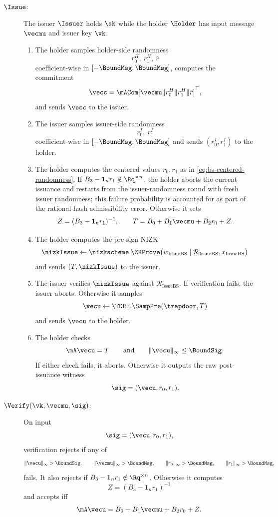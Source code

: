 \begin{description}
\item[$\Issue$:] The issuer $\Issuer$ holds $\sk$ while the holder $\Holder$ has input message $\vecmu$ and
issuer key $\vk$.
\begin{enumerate}[leftmargin=1.25em]
  \item The holder samples holder-side randomness
  \[
    r_0^H,\ r_1^H,\ \bar r
  \]
  coefficient-wise in $[-\BoundMsg,\BoundMsg]$, computes the commitment
  \[
    \vecc=\mACom[\vecmu\Vert r_0^H\Vert r_1^H\Vert \bar r]^\top,
  \]
  and sends $\vecc$ to the issuer.
  \item The issuer samples issuer-side randomness
  \[
    r_0^I,\ r_1^I
  \]
  coefficient-wise in $[-\BoundMsg,\BoundMsg]$ and sends $(r_0^I,r_1^I)$ to the holder.
  \item The holder computes the centered values $r_0,r_1$ as in
  \eqref{eq:bs-centered-randomness}.  If $B_3-\mathbf 1_n r_1\notin\Rq^{\times n}$, the holder aborts the current issuance and restarts from the issuer-randomness round with fresh issuer randomness; this failure probability is accounted for as part of the rational-hash admissibility error.  Otherwise it sets
  \[
    Z=(B_3-\mathbf 1_n r_1)^{-1},
    \qquad
    T=B_0+B_1\vecmu+B_2r_0+Z.
  \]
  \item The holder computes the pre-sign NIZK
  \[
    \nizkIssue\gets \nizkscheme.\ZKProve
      \bigl(w_{\mathrm{IssueBS}}\mid \mathcal R_{\mathrm{IssueBS}},x_{\mathrm{IssueBS}}\bigr)
  \]
  and sends $(T,\nizkIssue)$ to the issuer.
  \item The issuer verifies $\nizkIssue$ against $\mathcal R_{\mathrm{IssueBS}}$.  If verification fails, the issuer
  aborts.  Otherwise it samples
  \[
    \vecu\gets \TDRH.\SampPre(\trapdoor,T)
  \]
  and sends $\vecu$ to the holder.
  \item The holder checks
  \[
    \mA\vecu=T
    \qquad\text{and}\qquad
    \|\vecu\|_\infty\le \BoundSig.
  \]
  If either check fails, it aborts.  Otherwise it outputs the raw post-issuance witness
  \[
    \sig=(\vecu,r_0,r_1).
  \]
\end{enumerate}

\item[$\Verify(\vk,\vecmu,\sig)$:] On input
\[
  \sig=(\vecu,r_0,r_1),
\]
verification rejects if any of
\[
  \|\vecu\|_\infty>\BoundSig,
  \qquad
  \|\vecmu\|_\infty>\BoundMsg,
  \qquad
  \|r_0\|_\infty>\BoundMsg,
  \qquad
  \|r_1\|_\infty>\BoundMsg,
\]
fails.  It also rejects if $B_3-\mathbf 1_n r_1\notin\Rq^{\times n}$.  Otherwise it computes
\[
  Z=(B_3-\mathbf 1_n r_1)^{-1}
\]
and accepts iff
\[
  \mA\vecu=B_0+B_1\vecmu+B_2r_0+Z.
\]
\end{description}

